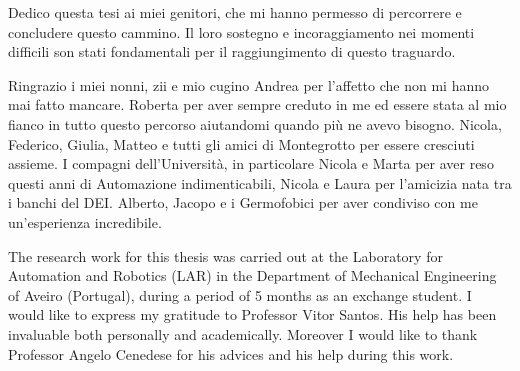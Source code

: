 Dedico questa tesi ai miei genitori, che mi hanno permesso  di percorrere e concludere questo cammino. Il loro sostegno e incoraggiamento nei momenti difficili son stati fondamentali per il raggiungimento di questo traguardo.
\vspace{3em}

Ringrazio i miei nonni, zii e mio cugino Andrea per l'affetto che non mi hanno mai fatto mancare. Roberta per aver sempre creduto in me ed essere stata al mio fianco in tutto questo percorso aiutandomi quando più ne avevo bisogno. Nicola, Federico, Giulia, Matteo e tutti gli amici di Montegrotto per essere cresciuti assieme. I compagni dell'Università, in particolare Nicola e Marta per aver reso questi anni di Automazione indimenticabili, Nicola e Laura per l'amicizia nata tra i banchi del DEI. Alberto, Jacopo e i Germofobici per aver condiviso con me un'esperienza incredibile. 
\vspace{3em}

The research work for this thesis was carried out at the Laboratory for Automation and Robotics (LAR) in the Department of Mechanical Engineering of Aveiro (Portugal), during a period of 5 months as an exchange student.
I would like to express my gratitude to Professor Vitor Santos. His help has been invaluable both personally and academically. Moreover I would like to thank Professor Angelo Cenedese for his advices and his help during this work.


